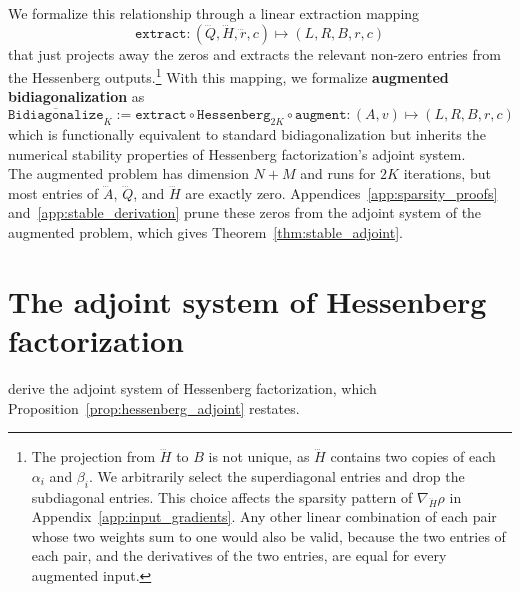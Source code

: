 \documentclass[a4paper,12pt]{article}
\theoremstyle{definition}
\begin{document}
\noindent
We formalize this relationship through a linear extraction mapping 
$$\texttt{extract}: (\dddot{Q}, \dddot{H}, \dddot{r}, c) \mapsto (L, R, B, r, c)$$ 
that just projects away the zeros and extracts the relevant non-zero entries from the Hessenberg outputs.\footnote{The projection from $\dddot{H}$ to $B$ is not unique, as $\dddot{H}$ contains two copies of each $\alpha_i$ and $\beta_i$. We arbitrarily select the superdiagonal entries and drop the subdiagonal entries. This choice affects the sparsity pattern of $\nabla_{\dddot{H}} \rho$ in Appendix~\ref{app:input_gradients}. Any other linear combination of each pair whose two weights sum to one would also be valid, because the two entries of each pair, and the derivatives of the two entries, are equal for every augmented input.} With this mapping, we formalize \textbf{augmented bidiagonalization} as $$\overline{\texttt{Bidiagonalize}}_K := \texttt{extract} \circ \texttt{Hessenberg}_{2K} \circ \texttt{augment} : (A, v) \mapsto (L, R, B, r, c)$$ which is functionally equivalent to standard bidiagonalization but inherits the numerical stability properties of Hessenberg factorization's adjoint system. 
\\
The augmented problem has dimension $N + M$ and runs for $2K$ iterations, but most entries of $\dddot{A}$, $\dddot{Q}$, and $\dddot{H}$ are exactly zero. Appendices~\ref{app:sparsity_proofs} and~\ref{app:stable_derivation} prune these zeros from the adjoint system of the augmented problem, which gives Theorem~\ref{thm:stable_adjoint}.

\section{The adjoint system of Hessenberg factorization}\label{subsec:adjoint_hessenberg}
\citet[Theorem~4.1]{kraemer2024gradients} derive the adjoint system of Hessenberg factorization, which Proposition~\ref{prop:hessenberg_adjoint} restates.
\end{document}
